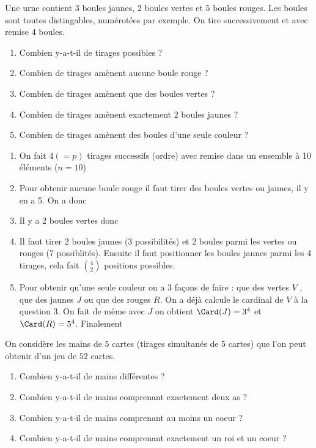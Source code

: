 \documentclass[a4paper, 11pt,reqno]{article}
\begin{document}
\begin{exercice}
Une urne contient 3 boules jaunes, 2 boules vertes et 5 boules rouges. Les boules sont toutes distingables, numérotées par exemple.  On tire successivement et avec remise 4 boules.
\begin{enumerate}
\item Combien y-a-t-il de tirages possibles ? 
\item Combien de tirages amènent aucune boule rouge ?
\item Combien de tirages amènent que des boules vertes ?
\item Combien de tirages amènent exactement 2 boules jaunes ?
\item Combien de tirages amènent des boules d'une seule couleur ?
\end{enumerate}

\end{exercice}
\begin{enumerate}
\item On fait $4 (=p)$ tirages successifs (ordre) avec remise dans un ensemble à 10 éléments ($n=10$)
\item Pour obtenir aucune boule rouge il faut tirer des boules vertes ou jaunes, il y en  a 5. On  a donc 
\item Il y a 2 boules vertes donc 

\item Il faut tirer 2 boules jaunes (3 possibilités) et 2 boules parmi les vertes ou rouges (7 possiblités). Ensuite il faut positionner les boules jaunes parmi les 4 tirages, cela fait $\binom{4}{2}$ positions possibles. 
\item Pour obtenir qu'une seule couleur on a 3 façons de faire : que des vertes $V$ , que des jaunes $J$ ou que des rouges $R$. 
On a déjà calcule le cardinal de $V$ à la question 3. On fait de même avec $J$ on obtient $\Card(J) =3^4$ et $\Card(R)=5^4$. Finalement 

\end{enumerate}

\begin{exercice}
On considère les mains  de $5$ cartes (tirages simultanés de 5 cartes) que l'on  peut obtenir d'un jeu de $52$ cartes. 
\begin{enumerate}
\item Combien y-a-t-il de mains différentes ? 
\item  Combien y-a-t-il de mains  comprenant exactement deux as ?
\item  Combien y-a-t-il de mains  comprenant au moins un coeur ?
\item  Combien y-a-t-il de mains  comprenant exactement un roi et un coeur  ?
\end{enumerate}
\end{exercice}
\end{document}

